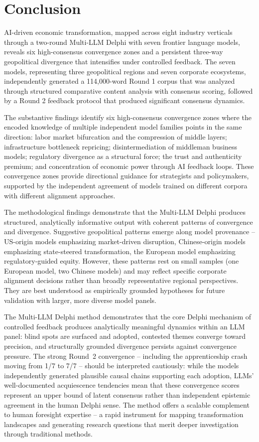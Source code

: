 \documentclass[preprint,review,12pt]{elsarticle}
\begin{document}
\section{Conclusion}
\label{sec:conclusion}

AI-driven economic transformation, mapped across eight industry verticals through a two-round Multi-LLM Delphi with seven frontier language models, reveals six high-consensus convergence zones and a persistent three-way geopolitical divergence that intensifies under controlled feedback. The seven models, representing three geopolitical regions and seven corporate ecosystems, independently generated a 114,000-word Round 1 corpus that was analyzed through structured comparative content analysis with consensus scoring, followed by a Round 2 feedback protocol that produced significant consensus dynamics.

The substantive findings identify six high-consensus convergence zones where the encoded knowledge of multiple independent model families points in the same direction: labor market bifurcation and the compression of middle layers; infrastructure bottleneck repricing; disintermediation of middleman business models; regulatory divergence as a structural force; the trust and authenticity premium; and concentration of economic power through AI feedback loops. These convergence zones provide directional guidance for strategists and policymakers, supported by the independent agreement of models trained on different corpora with different alignment approaches.

The methodological findings demonstrate that the Multi-LLM Delphi produces structured, analytically informative output with coherent patterns of convergence and divergence. Suggestive geopolitical patterns emerge along model provenance -- US-origin models emphasizing market-driven disruption, Chinese-origin models emphasizing state-steered transformation, the European model emphasizing regulatory-guided equity. However, these patterns rest on small samples (one European model, two Chinese models) and may reflect specific corporate alignment decisions rather than broadly representative regional perspectives. They are best understood as empirically grounded hypotheses for future validation with larger, more diverse model panels.

The Multi-LLM Delphi method demonstrates that the core Delphi mechanism of controlled feedback produces analytically meaningful dynamics within an LLM panel: blind spots are surfaced and adopted, contested themes converge toward precision, and structurally grounded divergence persists against convergence pressure. The strong Round~2 convergence -- including the apprenticeship crash moving from 1/7 to 7/7 -- should be interpreted cautiously: while the models independently generated plausible causal chains supporting each adoption, LLMs' well-documented acquiescence tendencies mean that these convergence scores represent an upper bound of latent consensus rather than independent epistemic agreement in the human Delphi sense. The method offers a scalable complement to human foresight expertise -- a rapid instrument for mapping transformation landscapes and generating research questions that merit deeper investigation through traditional methods.
\end{document}
